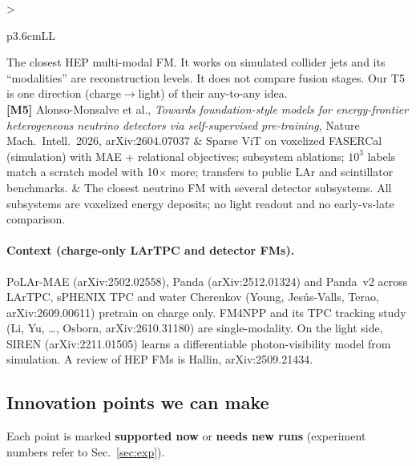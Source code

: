 \documentclass[11pt,a4paper]{article}
\newcommand{\have}{{\color{green!45!black}\textbf{supported now}}}
\newcommand{\need}{{\color{orange!80!black}\textbf{needs new runs}}}
\begin{document}
\begin{table}[H]
\begin{tabularx}{\textwidth}{>{\raggedright\arraybackslash}p{3.6cm}LL}
The closest HEP multi-modal FM. It works on simulated collider jets and its ``modalities'' are reconstruction levels. It does not compare fusion stages. Our T5 is one direction (charge$\to$light) of their any-to-any idea.\\\midrule
\textbf{[M5]} Alonso-Monsalve et al., \emph{Towards foundation-style models for energy-frontier heterogeneous neutrino detectors via self-supervised pre-training}, Nature Mach.\ Intell.\ 2026, arXiv:2604.07037 &
Sparse ViT on voxelized FASERCal (simulation) with MAE + relational objectives; subsystem ablations; $10^3$ labels match a scratch model with 10$\times$ more; transfers to public LAr and scintillator benchmarks. &
The closest neutrino FM with several detector subsystems. All subsystems are voxelized energy deposits; no light readout and no early-vs-late comparison.\\
\bottomrule\end{tabularx}
\end{table}

\paragraph{Context (charge-only LArTPC and detector FMs).} PoLAr-MAE (arXiv:2502.02558), Panda (arXiv:2512.01324) and Panda~v2 across LArTPC, sPHENIX TPC and water Cherenkov (Young, Jes\'us-Valls, Terao, arXiv:2609.00611) pretrain on charge only. FM4NPP and its TPC tracking study (Li, Yu, \dots, Osborn, arXiv:2610.31180) are single-modality. On the light side, SIREN (arXiv:2211.01505) learns a differentiable photon-visibility model from simulation. A review of HEP FMs is Hallin, arXiv:2509.21434.

\subsection{Innovation points we can make}
Each point is marked \have{} or \need{} (experiment numbers refer to Sec.~\ref{sec:exp}).
\end{document}
